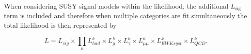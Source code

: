 When considering \ac{SUSY} signal models within the likelihood, the additional $L_{\text{sig}}$ term is included and therefore when multiple categories are fit simultaneously the total likelihood is then represented by 

\begin{equation}
L =  L_{sig} \times \prod_{k} L^{k}_{had} \times  L^{k}_{\mu} \times  L^{k}_{\gamma} \times  L^{k}_{\mu\mu} \times  L^{k}_{EWK syst} \times  L^{k}_{QCD}.
\end{equation}
